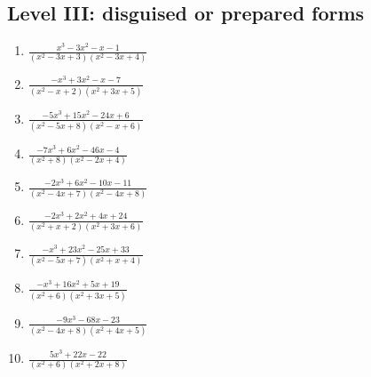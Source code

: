 \documentclass[11pt,oneside]{book}
\begin{document}
\subsection*{Level III: disguised or prepared forms}
\begin{enumerate}[leftmargin=*,label=\textbf{\arabic*.},itemsep=0.65\baselineskip]
\item $\displaystyle \frac{x^{3} - 3 x^{2} - x - 1}{\left(x^{2} - 3 x + 3\right) \left(x^{2} - 3 x + 4\right)}$
\item $\displaystyle \frac{- x^{3} + 3 x^{2} - x - 7}{\left(x^{2} - x + 2\right) \left(x^{2} + 3 x + 5\right)}$
\item $\displaystyle \frac{- 5 x^{3} + 15 x^{2} - 24 x + 6}{\left(x^{2} - 5 x + 8\right) \left(x^{2} - x + 6\right)}$
\item $\displaystyle \frac{- 7 x^{3} + 6 x^{2} - 46 x - 4}{\left(x^{2} + 8\right) \left(x^{2} - 2 x + 4\right)}$
\item $\displaystyle \frac{- 2 x^{3} + 6 x^{2} - 10 x - 11}{\left(x^{2} - 4 x + 7\right) \left(x^{2} - 4 x + 8\right)}$
\item $\displaystyle \frac{- 2 x^{3} + 2 x^{2} + 4 x + 24}{\left(x^{2} + x + 2\right) \left(x^{2} + 3 x + 6\right)}$
\item $\displaystyle \frac{- x^{3} + 23 x^{2} - 25 x + 33}{\left(x^{2} - 5 x + 7\right) \left(x^{2} + x + 4\right)}$
\item $\displaystyle \frac{- x^{3} + 16 x^{2} + 5 x + 19}{\left(x^{2} + 6\right) \left(x^{2} + 3 x + 5\right)}$
\item $\displaystyle \frac{- 9 x^{3} - 68 x - 23}{\left(x^{2} - 4 x + 8\right) \left(x^{2} + 4 x + 5\right)}$
\item $\displaystyle \frac{5 x^{3} + 22 x - 22}{\left(x^{2} + 6\right) \left(x^{2} + 2 x + 8\right)}$
\end{enumerate}
\end{document}
